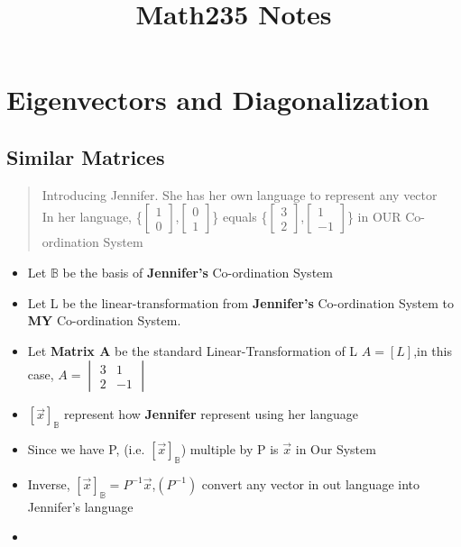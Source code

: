 \documentclass{report}
\title{Math235 Notes}
\begin{document}
\maketitle
\tableofcontents
\chapter{Eigenvectors and Diagonalization}
\section{Similar Matrices}
\begin{quote}
Introducing Jennifer. She has her own language to represent any vector\\In her language, \{$\begin{bmatrix}1\\0\end{bmatrix}$,$\begin{bmatrix}0\\1\end{bmatrix}$\} equals \{$\begin{bmatrix}3\\2\end{bmatrix}$,$\begin{bmatrix}1\\-1\end{bmatrix}$\} in OUR Co-ordination System
\end{quote}

\begin{itemize}
\item Let $\mathbb B$ be the basis of \textbf{Jennifer's} Co-ordination System
\item Let L be the linear-transformation from \textbf{Jennifer's} Co-ordination System to \textbf{MY} Co-ordination System.
\item Let \textbf{Matrix A} be the standard Linear-Transformation of L $A=[L]$,in this case, $A=\begin{vmatrix}3&1\\2&-1\end{vmatrix}$
\item $[\vec x]_{\mathbb{B}}$ represent how \textbf{Jennifer} represent  using her language
\item Since we have P,  (i.e. $[\vec{x}]_{\mathbb{B}}$) multiple by P is $\vec{x}$ in Our System 
\item Inverse, $[\vec{x}]_\mathbb{B} = P^{-1}\vec{x}$,$(P^{-1})$ convert any vector in out language into Jennifer's language
\item
\end{itemize}
\end{document}
